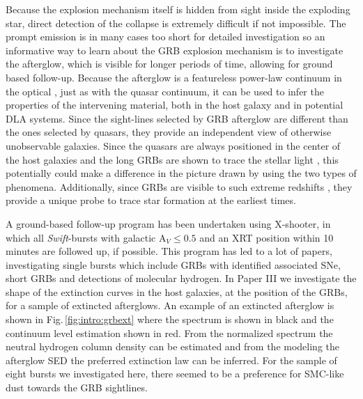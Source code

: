 Because the explosion mechanism itself is hidden from sight inside the exploding
star, direct detection of the collapse is extremely difficult if not impossible. The prompt
emission is in
many cases too short for detailed investigation so an informative
way to learn
about the GRB explosion mechanism is to investigate the afterglow,
which is
visible for longer periods of time, allowing for ground based
follow-up. Because
the afterglow is a featureless power-law continuum in the optical \citep{Paradijs2000},
just as with the
quasar continuum, it can be used to infer the properties of the
intervening material, both
in the host galaxy and in potential DLA systems.
Since the sight-lines selected
by GRB afterglow are different than the ones
selected by quasars, they provide
an independent view of otherwise unobservable
galaxies. Since the
quasars are always positioned in the center of the host
galaxies and the
long GRBs are shown to trace the stellar light
\citep{Fruchter2006,
Anderson2015}, this potentially could make a difference in
the picture drawn by using the two types of phenomena.
Additionally, since GRBs are visible to such extreme
redshifts
\citep[8.2 and 8.1,][]{Tanvir2009, Salvaterra2009}, they provide a
unique probe to trace star formation at
the earliest times. 

A ground-based follow-up program has been undertaken using X-shooter, in which
all \textit{Swift}-bursts with galactic A$_{V} \leq 0.5$ and an XRT position
within 10 minutes are followed up, if possible. This program has led to a lot of
papers, investigating single bursts \citep[e.g.][to mention some]{Sparre2011,
DElia2014, Kruhler2013a, Xu2013a, DeUgartePostigo2014, Schulze2014a, Japelj2015,
Hartoog2015} which include GRBs with identified associated SNe, short GRBs and
detections of molecular hydrogen. 
In Paper III \citep{Japelj2015} we
investigate the shape of the extinction curves in the host
galaxies, at the
position of the GRBs, for a sample of extincted afterglows. An
example of an
extincted afterglow is shown in Fig.\,\ref{fig:intro:grbext} where
the spectrum
is shown in black and the continuum level estimation shown in red.
From the
normalized spectrum the neutral hydrogen column density can be
estimated and
from the modeling the afterglow SED the preferred extinction law
can be
inferred. For the sample of eight bursts we investigated here, there
seemed to
be a preference for SMC-like dust towards the GRB sightlines. 

